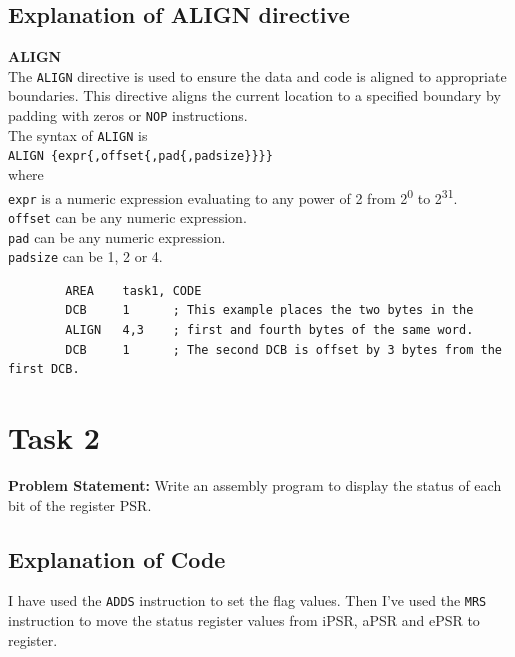 \documentclass[footheight=20pt, footsepline, headheight=20pt, headsepline]{scrartcl}
\begin{document}
\subsection*{Explanation of ALIGN directive}
\textbf{ALIGN}\\
The \verb|ALIGN| directive is used to ensure the data and code is aligned to appropriate boundaries. This directive aligns the current location to a specified boundary by padding with zeros or \verb|NOP| instructions.\\
The syntax of \verb|ALIGN| is\\
\verb|ALIGN {expr{,offset{,pad{,padsize}}}}|\\
where \\
\verb|expr| is a numeric expression evaluating to any power of 2 from 2\textsuperscript{0} to 2\textsuperscript{31}.\\
\verb|offset| can be any numeric expression.\\
\verb|pad| can be any numeric expression.\\
\verb|padsize| can be 1, 2 or 4.
\begin{lstlisting}
        AREA    task1, CODE
        DCB     1      ; This example places the two bytes in the 
        ALIGN   4,3    ; first and fourth bytes of the same word.
        DCB     1      ; The second DCB is offset by 3 bytes from the first DCB.                        
\end{lstlisting}

\newpage
\FloatBarrier
\section*{Task 2}
\textbf{Problem Statement:} Write an assembly program to display the status of each bit of the register PSR.
\subsection*{Explanation of Code}
I have used the \verb|ADDS| instruction to set the flag values. Then I've used the \verb|MRS| instruction to move the status register values from iPSR, aPSR and ePSR to register.
\end{document}
